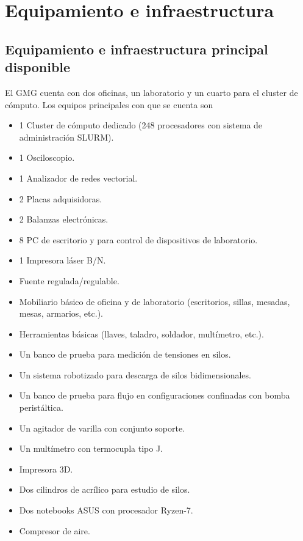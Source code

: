 \documentclass[a4paper,11pt,twoside,final,titlepage,onecolumn,openright]{report}
\begin{document}
\section{Equipamiento e infraestructura}

\subsection{Equipamiento e infraestructura principal disponible}

El GMG cuenta con dos oficinas, un laboratorio y un cuarto para el cluster de cómputo. Los equipos principales con que se cuenta son

\begin{itemize}
 \item 1 Cluster de cómputo dedicado (248 procesadores con sistema de administración SLURM).
 \item 1 Osciloscopio.
 \item 1 Analizador de redes vectorial.
 \item 2 Placas adquisidoras.
 \item 2 Balanzas electrónicas.
 \item 8 PC de escritorio y para control de dispositivos de laboratorio.
 \item 1 Impresora láser B/N.
 \item Fuente regulada/regulable.
 \item Mobiliario básico de oficina y de laboratorio (escritorios, sillas, mesadas, mesas, armarios, etc.).
 \item Herramientas básicas (llaves, taladro, soldador, multímetro, etc.).
 \item Un banco de prueba para medición de tensiones en silos.
 \item Un sistema robotizado para descarga de silos bidimensionales.
 \item Un banco de prueba para flujo en configuraciones confinadas con bomba peristáltica.
 \item Un agitador de varilla con conjunto soporte.
 \item Un multímetro con termocupla tipo J.
\item Impresora 3D.
\item Dos cilindros de acrílico para estudio de silos.
\item Dos notebooks ASUS con procesador Ryzen-7.
\item Compresor de aire.
\end{itemize}
\end{document}
